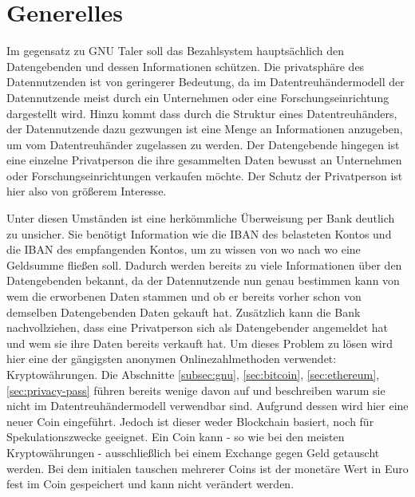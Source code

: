 \documentclass[11pt,a4paper]{scrreprt}
\begin{document}
\section{Generelles}
Im gegensatz zu GNU Taler soll das Bezahlsystem hauptsächlich den Datengebenden und dessen Informationen schützen. Die privatsphäre des Datennutzenden ist von geringerer Bedeutung, da im Datentreuhändermodell der Datennutzende meist durch ein Unternehmen oder eine Forschungseinrichtung dargestellt wird. Hinzu kommt dass durch die Struktur eines Datentreuhänders, der Datennutzende dazu gezwungen ist eine Menge an Informationen anzugeben, um vom Datentreuhänder zugelassen zu werden. Der Datengebende hingegen ist eine einzelne Privatperson die ihre gesammelten Daten bewusst an Unternehmen oder Forschungseinrichtungen verkaufen möchte. Der Schutz der Privatperson ist hier also von größerem Interesse. 

Unter diesen Umständen ist eine herkömmliche Überweisung per Bank deutlich zu unsicher. Sie benötigt Information wie die IBAN des belasteten Kontos und die IBAN des empfangenden Kontos, um zu wissen von wo nach wo eine Geldsumme fließen soll. Dadurch werden bereits zu viele Informationen über den Datengebenden bekannt, da der Datennutzende nun genau bestimmen kann von wem die erworbenen Daten stammen und ob er bereits vorher schon von demselben Datengebenden Daten gekauft hat. Zusätzlich kann die Bank nachvollziehen, dass eine Privatperson sich als Datengebender angemeldet hat und wem sie ihre Daten bereits verkauft hat.
Um dieses Problem zu lösen wird hier eine der gängigsten anonymen Onlinezahlmethoden verwendet: Kryptowährungen. Die Abschnitte \ref{subsec:gnu}, \ref{sec:bitcoin}, \ref{sec:ethereum}, \ref{sec:privacy-pass} führen bereits wenige davon auf und beschreiben warum sie nicht im Datentreuhändermodell verwendbar sind. Aufgrund dessen wird hier eine neuer Coin eingeführt. Jedoch ist dieser weder Blockchain basiert, noch für Spekulationszwecke geeignet. Ein Coin kann - so wie bei den meisten Kryptowährungen - ausschließlich bei einem Exchange gegen Geld getauscht werden. Bei dem initialen tauschen mehrerer Coins ist der monetäre Wert in Euro fest im Coin gespeichert und kann nicht verändert werden. 
\end{document}
